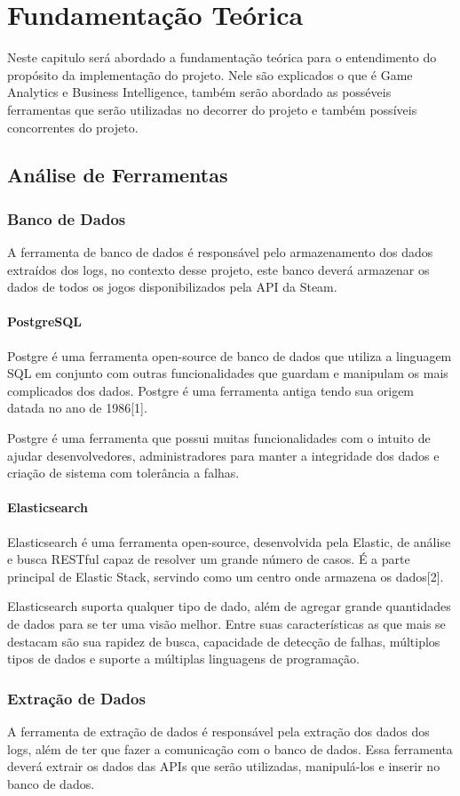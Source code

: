 \chapter*[Fundamentação Teórica]{Fundamentação Teórica}
Neste capitulo será abordado a fundamentação teórica para o entendimento do propósito da implementação do projeto. Nele são explicados o que é Game Analytics e Business Intelligence, também serão abordado as posséveis ferramentas que serão utilizadas no decorrer do projeto e também possíveis concorrentes do projeto.
\section*{Análise de Ferramentas}
\subsection*{Banco de Dados}
A ferramenta de banco de dados é responsável pelo armazenamento dos dados extraídos dos logs, no contexto desse projeto, este banco deverá armazenar os dados de todos os jogos disponibilizados pela API da Steam.
\subsubsection*{PostgreSQL}
Postgre é uma ferramenta open-source de banco de dados que utiliza a linguagem SQL em conjunto com outras funcionalidades que guardam e manipulam os mais complicados dos dados. Postgre é uma ferramenta antiga tendo sua origem datada no ano de 1986[1].

Postgre é uma ferramenta que possui muitas funcionalidades com o intuito de ajudar desenvolvedores, administradores para manter a integridade dos dados e criação de sistema com tolerância a falhas.
\subsubsection*{Elasticsearch}
Elasticsearch é uma ferramenta open-source, desenvolvida pela Elastic, de análise e busca RESTful capaz de resolver um grande número de casos. É a parte principal de Elastic Stack, servindo como um centro onde armazena os dados[2].

Elasticsearch suporta qualquer tipo de dado, além de agregar grande quantidades de dados para se ter uma visão melhor. Entre suas características as que mais se destacam são sua rapidez de busca, capacidade de detecção de falhas, múltiplos tipos de dados e suporte a múltiplas linguagens de programação.
\subsection*{Extração de Dados}
A ferramenta de extração de dados é responsável pela extração dos dados dos logs, além de ter que fazer a comunicação com o banco de dados. Essa ferramenta deverá extrair os dados das APIs que serão utilizadas, manipulá-los e inserir no banco de dados.
